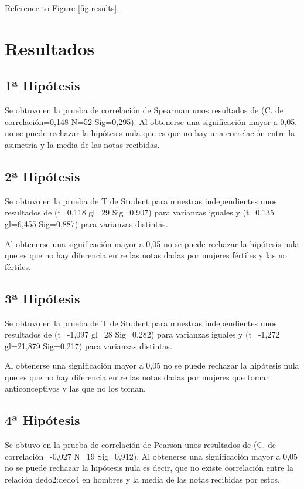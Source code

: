 \documentclass[fleqn,10pt]{SelfArx} %
\begin{document}
Reference to Figure \ref{fig:results}.


\section{Resultados}

\subsection{1ª Hipótesis}

Se obtuvo en la prueba de correlación de Spearman unos resultados de (C. de correlación=0,148 N=52
Sig=0,295). Al obtenerse una significación mayor a 0,05, no se puede rechazar la hipótesis nula que es que no hay una correlación entre la asimetría y la media de las notas recibidas.

\subsection{2ª Hipótesis}

Se obtuvo en la prueba de T de Student para muestras independientes unos resultados de (t=0,118 gl=29 Sig=0,907) para varianzas iguales y (t=0,135 gl=6,455 Sig=0,887) para varianzas distintas.

Al obtenerse una significación mayor a 0,05 no se puede rechazar la hipótesis nula que es que no hay diferencia entre las notas dadas por mujeres fértiles y las no fértiles.

\subsection{3ª Hipótesis}

Se obtuvo en la prueba de T de Student para muestras independientes unos resultados de (t=-1,097 gl=28 Sig=0,282) para varianzas iguales y (t=-1,272 gl=21,879 Sig=0,217) para varianzas distintas.

Al obtenerse una significación mayor a 0,05 no se puede rechazar la hipótesis nula que es que no hay diferencia entre las notas dadas por mujeres que toman anticonceptivos y las que no los toman.

\subsection{4ª Hipótesis}

Se obtuvo en la prueba de correlación de Pearson unos resultados de (C. de correlación=-0,027 N=19 Sig=0,912). Al obtenerse una significación mayor a 0,05 no se puede rechazar la hipótesis nula es decir, que no existe correlación entre la relación dedo2:dedo4 en hombres y la media de las notas recibidas por estos.
\end{document}
